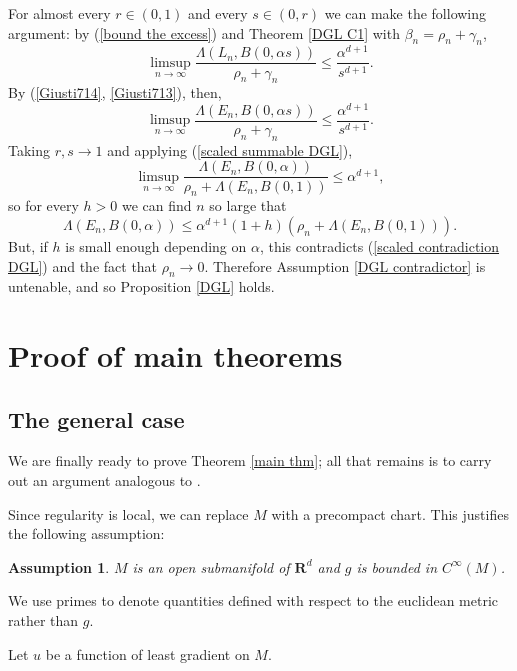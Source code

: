 \documentclass[reqno,12pt,letterpaper]{amsart}
\newcommand{\RR}{\mathbf{R}}
\newtheorem{assumption}[theorem]{Assumption}
\theoremstyle{definition}
\numberwithin{equation}{section}
\begin{document}
For almost every $r \in (0, 1)$ and every $s \in (0, r)$ we can make the following argument: by (\ref{bound the excess}) and Theorem \ref{DGL C1} with $\beta_n = \rho_n + \gamma_n$,
$$\limsup_{n \to \infty} \frac{\Lambda(L_n, B(0, \alpha s))}{\rho_n + \gamma_n} \leq \frac{\alpha^{d + 1}}{s^{d + 1}}.$$
By (\ref{Giusti714}, \ref{Giusti713}), then,
$$\limsup_{n \to \infty} \frac{\Lambda(E_n, B(0, \alpha s))}{\rho_n + \gamma_n} \leq \frac{\alpha^{d + 1}}{s^{d + 1}}.$$
Taking $r, s \to 1$ and applying (\ref{scaled summable DGL}),
$$\limsup_{n \to \infty} \frac{\Lambda(E_n, B(0, \alpha))}{\rho_n + \Lambda(E_n, B(0, 1))} \leq \alpha^{d + 1},$$
so for every $h > 0$ we can find $n$ so large that
$$\Lambda(E_n, B(0, \alpha)) \leq \alpha^{d + 1}(1 + h)(\rho_n + \Lambda(E_n, B(0, 1))).$$
But, if $h$ is small enough depending on $\alpha$, this contradicts (\ref{scaled contradiction DGL}) and the fact that $\rho_n \to 0$.
Therefore Assumption \ref{DGL contradictor} is untenable, and so Proposition \ref{DGL} holds.

\section{Proof of main theorems}\label{proof of main thm}
\subsection{The general case}
We are finally ready to prove Theorem \ref{main thm}; all that remains is to carry out an argument analogous to \cite[Teorema 4]{Miranda67}.

Since regularity is local, we can replace $M$ with a precompact chart.
This justifies the following assumption:

\begin{assumption}
$M$ is an open submanifold of $\RR^d$ and $g$ is bounded in $C^\infty(M)$.
\end{assumption}

We use primes to denote quantities defined with respect to the euclidean metric rather than $g$.

Let $u$ be a function of least gradient on $M$.
\end{document}
